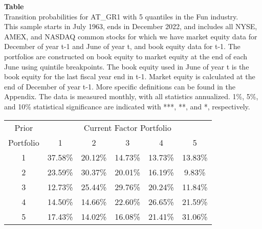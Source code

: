 \begin{table*}[ht!]
\raggedright
{}
\label{tab: transition_probs_AT_GR1_Fun_with_5_quantiles}
\textbf{Table \thetable} \\
Transition probabilities for AT_GR1 with 5 quantiles in the Fun industry. \\
\hspace*{1em}This sample starts in July 1963, ends in December 2022, and includes all NYSE, AMEX, and NASDAQ common stocks for which we have market equity data for December of year t-1 and June of year t, and book equity data for t-1. The portfolios are constructed on book equity to market equity at the end of each June using quintile breakpoints.  The book equity used in June of year t is the book equity for the last fiscal year end in t-1.  Market equity is calculated at the end of December of year t-1.  More specific definitions can be found in the Appendix.  The data is measured monthly, with all statistics annualized.  1\%, 5\%, and 10\% statistical significance are indicated with ***, **, and *, respectively. \\
\vspace{0.5em}
\centering
\begin{adjustbox}{max width=\textwidth}
\begin{tabular}{@{}cccccc@{}}
\toprule
Prior & \multicolumn{5}{c}{Current Factor Portfolio} \\
Portfolio & 1 & 2 & 3 & 4 & 5 \\
\midrule
1 & 37.58\% & 20.12\% & 14.73\% & 13.73\% & 13.83\% \\
2 & 23.59\% & 30.37\% & 20.01\% & 16.19\% & 9.83\% \\
3 & 12.73\% & 25.44\% & 29.76\% & 20.24\% & 11.84\% \\
4 & 14.50\% & 14.66\% & 22.60\% & 26.65\% & 21.59\% \\
5 & 17.43\% & 14.02\% & 16.08\% & 21.41\% & 31.06\% \\
\bottomrule
\end{tabular}
\end{adjustbox}
\end{table*}